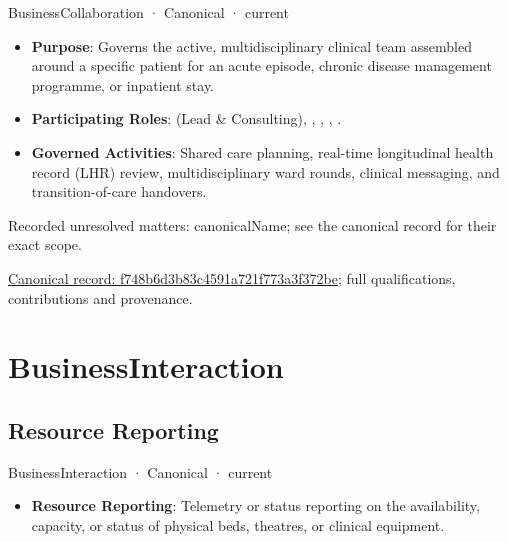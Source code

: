 \label{element:f748b6d3b83c4591a721f773a3f372be}
{\small BusinessCollaboration · Canonical · current}\par

\begin{itemize}


\item \textbf{Purpose}: Governs the active, multidisciplinary clinical team assembled around a specific patient for an acute episode, chronic disease management programme, or inpatient stay.

\item \textbf{Participating Roles}: \texttt{} (Lead \& Consulting), \texttt{}, \texttt{}, \texttt{}, \texttt{}.

\item \textbf{Governed Activities}: Shared care planning, real-time longitudinal health record (LHR) review, multidisciplinary ward rounds, clinical messaging, and transition-of-care handovers.

\end{itemize}

{\small Recorded unresolved matters: canonicalName; see the canonical record for their exact scope.}\par
{\footnotesize \href{../../../../continuum/business/business-collaboration/f748b6d3b83c4591a721f773a3f372be.md}{Canonical record: f748b6d3b83c4591a721f773a3f372be}; full qualifications, contributions and provenance.}\par
\section{BusinessInteraction}

\subsection{Resource Reporting}

\label{element:05bf8e557ce14f0eb1c869d07c5a93ca}
{\small BusinessInteraction · Canonical · current}\par

\begin{itemize}


\item \textbf{Resource Reporting}: Telemetry or status reporting on the availability, capacity, or status of physical beds, theatres, or clinical equipment.

\end{itemize}

